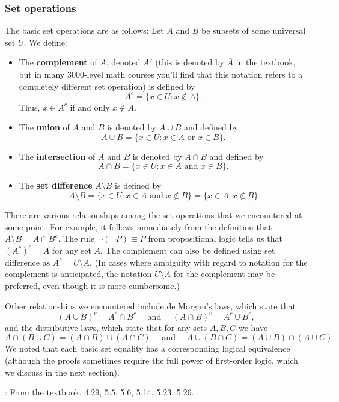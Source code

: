 \documentclass[letterpaper,12pt]{article}
\begin{document}
\subsubsection*{Set operations}
The basic set operations are as follows: Let $A$ and $B$ be subsets of some universal set $U$. We define:
\begin{itemize}
\item The {\bf complement} of $A$, denoted $A^c$ (this is denoted by $\overline{A}$ in the textbook, but in many 3000-level math courses you'll find that this notation refers to a completely different set operation) is defined by
\[
A^c = \{x\in U :  x\notin A\}.
\]
Thus, $x\in A^c$ if and only $x\notin A$.
\item The {\bf union} of $A$ and $B$ is denoted by $A\cup B$ and defined by
\[
A\cup B = \{x\in U : x\in A \text{ or } x\in B\}.
\]
\item The {\bf intersection} of $A$ and $B$ is denoted by $A\cap B$ and defined by
\[
A\cap B = \{x\in U : x\in A \text{ and } x\in B\}.
\]
\item The {\bf set difference} $A\setminus B$ is defined by
\[
A\setminus B = \{x\in U : x\in A \text{ and } x\notin B\} = \{x\in A: x\notin B\}
\]
\end{itemize}
There are various relationships among the set operations that we encountered at some point. For example, it follows immediately from the definition that $A\setminus B = A\cap B^c$. The rule $\neg (\neg P) \equiv P$ from propositional logic tells us that $(A^c)^c = A$ for any set $A$. The complement can also be defined using set difference as $A^c = U\setminus A$. (In cases where ambiguity with regard to notation for the complement is anticipated, the notation $U\setminus A$ for the complement may be preferred, even though it is more cumbersome.)

Other relationships we encountered include de Morgan's laws, which state that
\[
(A\cup B)^c = A^c\cap B^c \quad \text{ and } \quad (A\cap B)^c = A^c\cup B^c,
\]
and the distributive laws, which state that for any sets $A, B, C$ we have
\[
A\cap (B\cup C) = (A\cap B)\cup (A\cap C) \quad \text{ and }\quad A\cup (B\cap C) = (A\cup B)\cap (A\cup C).
\]
We noted that each basic set equality has a corresponding logical equivalence (although the proofs sometimes require the full power of first-order logic, which we discuss in the next section). 

\bigskip

: From the textbook, 4.29, 5.5, 5.6, 5.14, 5.23, 5.26.
\end{document}
